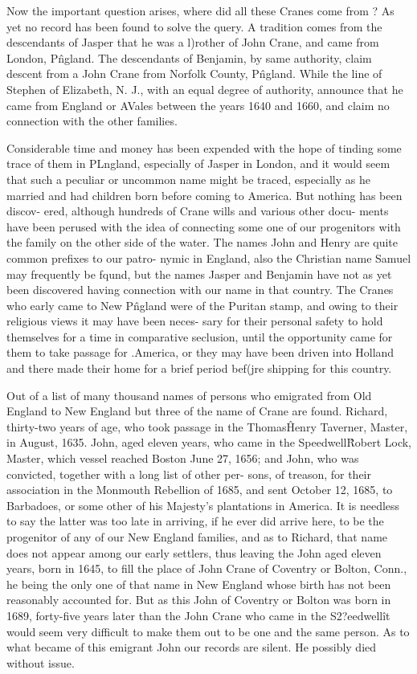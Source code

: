 Now the important question arises, where did all these Cranes 
come from ? As yet no record has been found to solve the query. 
A tradition comes from the descendants of Jasper that he was a 
l)rother of John Crane, and came from London, P\^ngland. The 
descendants of Benjamin, by same authority, claim descent from 
a John Crane from Norfolk County, P\^ngland. While the line of 
Stephen of Elizabeth, N. J., with an equal degree of authority, 
announce that he came from England or AVales between the years 
1640 and 1660, and claim no connection with the other families. 




Considerable time and money has been expended with the hope 
of tinding some trace of them in PLngland, especially of Jasper in 
London, and it would seem that such a peculiar or uncommon 
name might be traced, especially as he married and had children 
born before coming to America. But nothing has been discov- 
ered, although hundreds of Crane wills and various other docu- 
ments have been perused with the idea of connecting some one of 
our progenitors with the family on the other side of the water. 
The names John and Henry are quite common prefixes to our patro- 
nymic in England, also the Christian name Samuel may frequently 
be fqund, but the names Jasper and Benjamin have not as yet 
been discovered having connection with our name in that country. 
The Cranes who early came to New P\^ngland were of the Puritan 
stamp, and owing to their religious views it may have been neces- 
sary for their personal safety to hold themselves for a time in 
comparative seclusion, until the opportunity came for them to 
take passage for .America, or they may have been driven into 
Holland and there made their home for a brief period bef(jre 
shipping for this country. 

Out of a list of many thousand names of persons who emigrated 
from Old England to New England but three of the name of 
Crane are found. Richard, thirty-two years of age, who took 
passage in the Thomas\^ Henry Taverner, Master, in August, 1635. 
John, aged eleven years, who came in the Speedwell\^ Robert 
Lock, Master, which vessel reached Boston June 27, 1656; and 
John, who was convicted, together with a long list of other per- 
sons, of treason, for their association in the Monmouth Rebellion 
of 1685, and sent October 12, 1685, to Barbadoes, or some other 
of his Majesty's plantations in America. It is needless to say the 
latter was too late in arriving, if he ever did arrive here, to be 
the progenitor of any of our New England families, and as to 
Richard, that name does not appear among our early settlers, 
thus leaving the John aged eleven years, born in 1645, to fill the 
place of John Crane of Coventry or Bolton, Conn., he being the 
only one of that name in New England whose birth has not been 
reasonably accounted for. But as this John of Coventry or 
Bolton was born in 1689, forty-five years later than the John 
Crane who came in the S2?eedwell\^ it would seem very difficult to 
make them out to be one and the same person. As to what 
became of this emigrant John our records are silent. He possibly 
died without issue. 



